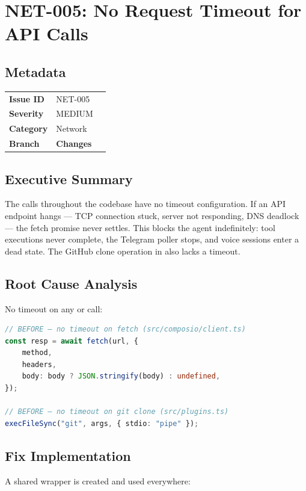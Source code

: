 \section{NET-005: No Request Timeout for API Calls}
\label{sec:net-005}
\subsection*{Metadata}
\begin{tabular}{ll}
\textbf{Issue ID} & NET-005 \\
\textbf{Severity} & MEDIUM \\
\textbf{Category} & Network \\
\textbf{Branch} & 
\textbf{Changes} &  \\
\end{tabular}

\subsection*{Executive Summary}
The  calls throughout the codebase have no timeout configuration. If an API endpoint hangs — TCP connection stuck, server not responding, DNS deadlock — the fetch promise never settles. This blocks the agent indefinitely: tool executions never complete, the Telegram poller stops, and voice sessions enter a dead state. The GitHub clone operation in  also lacks a timeout.

\subsection*{Root Cause Analysis}
No timeout on any  or  call:

\begin{lstlisting}[language=TypeScript]
// BEFORE — no timeout on fetch (src/composio/client.ts)
const resp = await fetch(url, {
    method,
    headers,
    body: body ? JSON.stringify(body) : undefined,
});

// BEFORE — no timeout on git clone (src/plugins.ts)
execFileSync("git", args, { stdio: "pipe" });
\end{lstlisting}

\subsection*{Fix Implementation}
A shared  wrapper is created and used everywhere:


